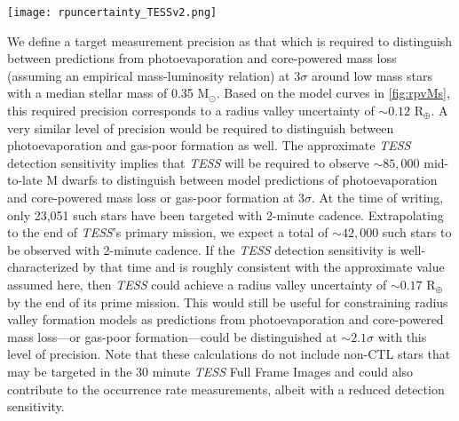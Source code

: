 \documentclass[twocolumn]{emulateapj}
\newcommand{\kepler}[1]{\emph{Kepler}#1}
\newcommand{\tess}[1]{\emph{TESS}#1}
\newcommand{\plato}[1]{\emph{PLATO}#1}
\begin{document}
\begin{figure*}
  \centering
  \texttt{[image: rpuncertainty\_TESSv2.png]}
  \caption{Expected improvement in the measurement precision of the radius valley location with the number of observed
    low mass stars. Measurement precision curves of the upper and lower uncertainties on the location of the radius valley 
    are derived from binomial statistics. These calculations use approximate and expected detection sensitivity
    values for the \tess{} (\emph{yellow}) and \plato{} (\emph{orange}) missions. The curve representing a hypothetical continuation
    of the primary \kepler{} mission is depicted in \emph{red}. The target precision of 0.12 R$_{\oplus}$ (\emph{shaded region})
    would enable models of photoevaporation to be distinguished from core-powered mass loss or gas-poor formation at $3\sigma$
    at $M_s=0.35$ M$_{\odot}$. Measurement precision curves are compared to the sample sizes of mid-to-late M dwarfs from the \tess{}
    Candidate Target List for sectors 1-14 (i.e. to the time of writing) and 1-26 (i.e. to the end of the \tess{} primary
    mission). Also included is the approximate number of mid-to-late M dwarfs included in the P4 sample of the
    PLATO Input Catalog.}
  \label{fig:improve}
\end{figure*}


We define a target measurement precision as that which is required to distinguish between predictions from photoevaporation
and core-powered mass loss (assuming an empirical mass-luminosity relation) at $3\sigma$ around low mass stars with a median
stellar mass of 0.35 M$_{\odot}$. Based on the model curves in \autoref{fig:rpvMs},
this required precision corresponds to a radius valley uncertainty of $\sim 0.12$ R$_{\oplus}$. A very similar level
of precision would be required to distinguish between photoevaporation and gas-poor formation as well.
The approximate \tess{} detection sensitivity implies that \tess{} will be required to observe $\sim 85,000$ mid-to-late M dwarfs
to distinguish between model predictions of photoevaporation and core-powered mass loss or gas-poor formation at $3\sigma$.
At the time of writing, only 23,051 such stars have been targeted with 2-minute cadence. Extrapolating to the end of \tess{'s}
primary mission, we expect a total of $\sim 42,000$ such stars to be observed with 2-minute cadence. If the \tess{} detection
sensitivity is well-characterized by that time and is roughly consistent with the approximate value assumed here, then \tess{}
could achieve a radius valley uncertainty of $\sim 0.17$ R$_{\oplus}$ by the end of its prime mission.
This would still be useful for constraining radius valley formation models as predictions from photoevaporation and
core-powered mass loss---or gas-poor formation---could be distinguished at $\sim 2.1\sigma$ with this level of precision.
Note that these calculations do not include non-CTL stars that may be targeted in the 30 minute \tess{} Full Frame Images
and could also contribute to the occurrence rate measurements, albeit with a reduced detection sensitivity.
\end{document}
